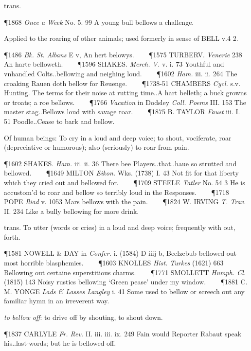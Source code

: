 \begin{description}[wide, labelwidth=!, labelindent=0pt]
\begin{myenumerate}
 trans.

\P 1868 \textit{Once a Week} No. 5. 99 A young bull bellows a challenge.

 Applied to the roaring of other animals; used formerly in sense of BELL v.4 2.

\P 1486  \textit{Bk. St. Albans} E v, An hert belowys.    
\P 1575 TURBERV.  \textit{Venerie} 238 An harte belloweth.    
\P 1596 SHAKES.  \textit{Merch. V.} v. i. 73 Youthful and vnhandled Colts..bellowing and neighing loud.    
\P 1602   \textit{Ham.} iii. ii. 264 The croaking Rauen doth bellow for Reuenge.    
\P 1738-51 CHAMBERS  \textit{Cycl.} s.v. Hunting. The terms for their noise at rutting time..A hart belleth; a buck growns or troats; a roe bellows.    
\P 1766 \textit{Vacation} in  Dodsley \textit{Coll. Poems} III. 153 The master stag..Bellows loud with savage roar.    
\P 1875 B. TAYLOR  \textit{Faust} iii. I. 51 Poodle..Cease to bark and bellow.

 Of human beings: To cry in a loud and deep voice; to shout, vociferate, roar (depreciative or humorous); also (seriously) to roar from pain.

\P 1602 SHAKES.  \textit{Ham.} iii. ii. 36 There bee Players..that..haue so strutted and bellowed.    
\P 1649 MILTON  \textit{Eikon.} Wks. (1738) I. 43 Not fit for that liberty which they cried out and bellowed for.    
\P 1709 STEELE  \textit{Tatler} No. 54 3 He is accustom'd to roar and bellow so terribly loud in the Responses.    
\P 1718 POPE  \textit{Iliad} v. 1053 Mars  bellows with the pain.    
\P 1824 W. IRVING  \textit{T. Trav.} II. 234 Like a bully bellowing for more drink.

 trans. To utter (words or cries) in a loud and deep voice; frequently with out, forth.

\P 1581 NOWELL \& DAY in  \textit{Confer.} i. (1584) D iiij b, Beelzebub bellowed out most horrible blasphemies.    
\P 1603 KNOLLES  \textit{Hist. Turkes} (1621) 663 Bellowing out certaine superstitious charms.    
\P 1771 SMOLLETT  \textit{Humph. Cl.} (1815) 143 Noisy rustics bellowing ‘Green pease’ under my window.    
\P 1881 C. M. YONGE  \textit{Lads \& Lasses Langley} i. 41 Some used to bellow or screech out any familiar hymn in an irreverent way.

 \textit{to bellow off}: to drive off by shouting, to shout down.

\P 1837 CARLYLE  \textit{Fr. Rev.} II. iii. iii. ix. 249 Fain would Reporter Rabaut speak his..last-words; but he is bellowed off.


\end{myenumerate}
\end{description}
